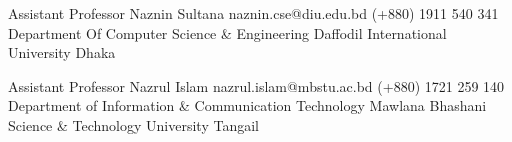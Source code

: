 

\begin{cvreferences}

  \cvreference
    {Assistant Professor} %
    {Naznin Sultana} %
    {naznin.cse@diu.edu.bd} %
    {(+880) 1911 540 341} %
    {Department Of Computer Science \& Engineering}
    {Daffodil International University}
    {Dhaka}
    
  \cvreference
    {Assistant Professor} %
    {Nazrul Islam} %
    {nazrul.islam@mbstu.ac.bd} %
    {(+880) 1721 259 140} %
    {Department of Information \& Communication Technology}
    {Mawlana Bhashani Science \& Technology University}
    {Tangail}
    





\end{cvreferences}

